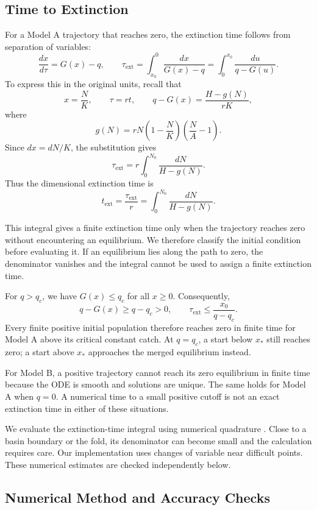 \subsection{Time to Extinction}
\label{sec:wp03-extinction}

For a Model A trajectory that reaches zero, the
extinction time follows from separation of variables:
\[
\frac{dx}{d\tau}=G(x)-q,
\qquad
\tau_{\mathrm{ext}}
=\int_{x_0}^{0}\frac{dx}{G(x)-q}
=\int_0^{x_0}\frac{du}{q-G(u)}.
\]
To express this in the original units, recall that
\[
x=\frac{N}{K},\qquad
\tau=rt,\qquad
q-G(x)=\frac{H-g(N)}{rK},
\]
where
\[
g(N)=rN\left(1-\frac{N}{K}\right)
\left(\frac{N}{A}-1\right).
\]
Since $dx=dN/K$, the substitution gives
\[
\tau_{\mathrm{ext}}
=r\int_0^{N_0}\frac{dN}{H-g(N)}.
\]
Thus the dimensional extinction time is
\begin{equation}
t_{\mathrm{ext}}
=\frac{\tau_{\mathrm{ext}}}{r}
=\int_0^{N_0}\frac{dN}{H-g(N)}.
\label{eq:wp03-extinction}
\end{equation}

This integral gives a finite extinction time only
when the trajectory reaches zero without encountering
an equilibrium. We therefore classify the initial
condition before evaluating it. If an equilibrium
lies along the path to zero, the denominator
vanishes and the integral cannot be used to assign
a finite extinction time.

For $q>q_c$, we have $G(x)\le q_c$ for all $x\ge0$.
Consequently,
\[
q-G(x)\ge q-q_c>0,
\qquad
\tau_{\mathrm{ext}}\le\frac{x_0}{q-q_c}.
\]
Every finite positive initial population therefore
reaches zero in finite time for Model A above its
critical constant catch. At $q=q_c$, a start below
$x_*$ still reaches zero; a start above $x_*$
approaches the merged equilibrium instead.

For Model B, a positive trajectory cannot reach
its zero equilibrium in finite time because the
ODE is smooth and solutions are unique. The same
holds for Model A when $q=0$. A numerical time
to a small positive cutoff is not an exact
extinction time in either of these situations.

We evaluate the extinction-time integral using
numerical quadrature \cite{scipy_quad}. Close to
a basin boundary or the fold, its denominator
can become small and the calculation requires
care. Our implementation uses changes of variable
near difficult points. These numerical estimates
are checked independently below.

\subsection{Numerical Method and Accuracy Checks}
\label{sec:wp03-validation}

